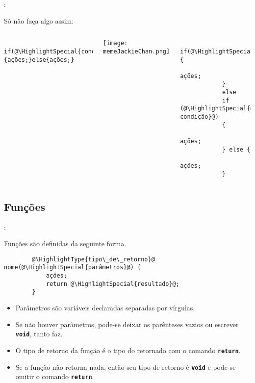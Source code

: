 \begin{frame}[fragile]{\insertsection: \insertsubsection}

	Só não faça algo assim:
	\begin{columns}[t]
		\begin{verbatim}
			if(@\HighlightSpecial{condição}@){ações;}else{ações;}
		\end{verbatim}
		\texttt{[image: memeJackieChan.png]}

		\begin{verbatim}
			if(@\HighlightSpecial{condição}@) {
				ações;
			}
			else
			if (@\HighlightSpecial{outra condição}@)
			{
				ações;
			} else {
				ações;
			}
		\end{verbatim}
	\end{columns}

\end{frame}


\subsection{Funções}


\begin{frame}[fragile]{\insertsection: \insertsubsection}

	Funções são definidas da seguinte forma.
	\begin{verbatim}
		@\HighlightType{tipo\_de\_retorno}@ nome(@\HighlightSpecial{parâmetros}@) {
			ações;
			return @\HighlightSpecial{resultado}@;
		}
	\end{verbatim}

	\begin{itemize}
		\item Parâmetros são variáveis declaradas separadas por vírgulas.
		\item Se não houver parâmetros, pode-se deixar os parênteses vazios ou escrever \texttt{\textbf{void}}, tanto faz.
		\item O tipo de retorno da função é o tipo do  retornado com o comando \texttt{\textbf{return}}.
		\item Se a função não retorna nada, então seu tipo de retorno é \texttt{\textbf{void}} e pode-se omitir o comando \texttt{\textbf{return}}.
	\end{itemize}

\end{frame}


